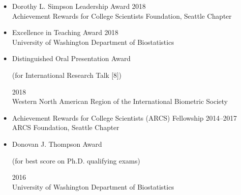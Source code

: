 \documentclass[margin]{res}
\begin{document}
\begin{resume}
\begin{itemize}
\item Dorothy L. Simpson Leadership Award \hfill 2018 \\ Achievement Rewards for College Scientists Foundation, Seattle Chapter
\item Excellence in Teaching Award  \hfill 2018 \\
University of Washington Department of Biostatistics
\item Distinguished Oral Presentation Award  \begin{footnotesize}(for International Research Talk [8])\end{footnotesize} \hfill 2018 \\ Western North American Region of the International Biometric Society  %
\item Achievement Rewards for College Scientists (ARCS) Fellowship \hfill 2014--2017 \\
ARCS Foundation, Seattle Chapter
\item Donovan J. Thompson Award \begin{footnotesize}(for best score on Ph.D. qualifying exams)\end{footnotesize} \hfill 2016 \\
University of Washington Department of Biostatistics %
\end{itemize}


\end{resume}
\end{document}

